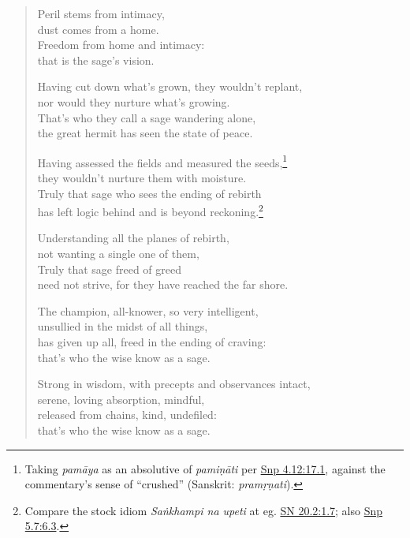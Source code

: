 \documentclass[12pt,openany]{book}%
\begin{document}
\begin{verse}%
Peril stems from intimacy, \\
dust comes from a home. \\
Freedom from home and intimacy: \\
that is the sage’s vision. 

Having cut down what’s grown, they wouldn’t replant, \\
nor would they nurture what’s growing. \\
That’s who they call a sage wandering alone, \\
the great hermit has seen the state of peace. 

Having assessed the fields and measured the seeds,\footnote{Taking \textit{\textsanskrit{pamāya}} as an absolutive of \textit{\textsanskrit{pamiṇāti}} per \href{https://suttacentral.net/snp4.12/en/sujato\#17.1}{Snp 4.12:17.1}, against the commentary’s sense of “crushed” (Sanskrit: \textit{\textsanskrit{pramṛṇati}}). } \\
they wouldn’t nurture them with moisture. \\
Truly that sage who sees the ending of rebirth \\
has left logic behind and is beyond reckoning.\footnote{Compare the stock idiom \textit{\textsanskrit{Saṅkhampi} na upeti} at eg. \href{https://suttacentral.net/sn20.2/en/sujato\#1.7}{SN 20.2:1.7}; also \href{https://suttacentral.net/snp5.7/en/sujato\#6.3}{Snp 5.7:6.3}. } 

Understanding all the planes of rebirth, \\
not wanting a single one of them, \\
Truly that sage freed of greed \\
need not strive, for they have reached the far shore. 

The champion, all-knower, so very intelligent, \\
unsullied in the midst of all things, \\
has given up all, freed in the ending of craving: \\
that’s who the wise know as a sage. 

Strong in wisdom, with precepts and observances intact, \\
serene, loving absorption, mindful, \\
released from chains, kind, undefiled: \\
that’s who the wise know as a sage. 


\end{verse}
\end{document}
